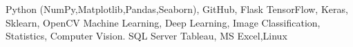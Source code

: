 %
%
%


\renewcommand{\baselinestretch}{1.1}
\setmainfont{Times New Roman}
\begin{keywords}
		{{Python} ({NumPy},Matplotlib,Pandas,Seaborn), GitHub, Flask}
		{TensorFlow, Keras, Sklearn, OpenCV }
		{ Machine Learning, Deep Learning, Image Classification,
		Statistics, Computer Vision.}
		{SQL Server}
		{Tableau, MS Excel,Linux}
\end{keywords}
\\